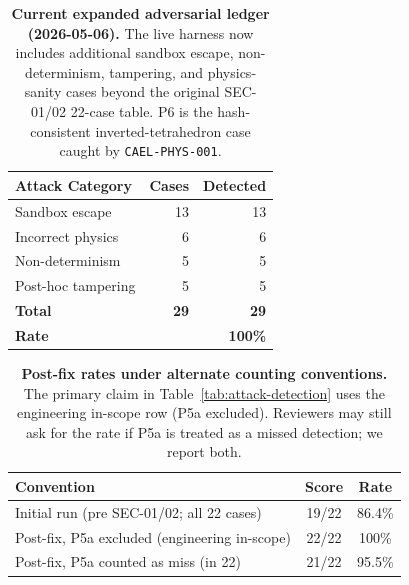 \documentclass[letterpaper,twocolumn,10pt]{article}
\providecommand{\measuredFrom}[1]{}
\begin{document}
\begin{table}[t]
\centering
\caption{\textbf{Current expanded adversarial ledger (2026-05-06).}
  The live harness now includes additional sandbox escape, non-determinism,
  tampering, and physics-sanity cases beyond the original SEC-01/02
  22-case table. P6 is the hash-consistent inverted-tetrahedron case
  caught by \texttt{CAEL-PHYS-001}.}
\label{tab:attack-detection-expanded}
\small
\measuredFrom{HoloScript/packages/security-sandbox/src/__tests__/adversarial-holo.test.ts}%
\begin{tabular}{@{}lrr@{}}
\toprule
\textbf{Attack Category} & \textbf{Cases} & \textbf{Detected} \\
\midrule
Sandbox escape      & 13 & 13 \\
Incorrect physics   & 6  & 6  \\
Non-determinism     & 5  & 5  \\
Post-hoc tampering  & 5  & 5  \\
\midrule
\textbf{Total}      & \textbf{29} & \textbf{29} \\
\textbf{Rate}       &              & \textbf{100\%} \\
\bottomrule
\end{tabular}
\end{table}

\begin{table}[t]
\centering
\caption{\textbf{Post-fix rates under alternate counting conventions.}
  The primary claim in Table~\ref{tab:attack-detection} uses the
  engineering in-scope row (P5a excluded). Reviewers may still ask for
  the rate if P5a is treated as a missed detection; we report both.}
\label{tab:attack-detection-counting}
\small
\measuredFrom{HoloScript/packages/security-sandbox/src/__tests__/adversarial-holo.test.ts}%
\begin{tabular}{@{}lcc@{}}
\toprule
\textbf{Convention} & \textbf{Score} & \textbf{Rate} \\
\midrule
Initial run (pre SEC-01/02; all 22 cases) & 19/22 & 86.4\% \\
Post-fix, P5a excluded (engineering in-scope) & 22/22 & 100\% \\
Post-fix, P5a counted as miss (in 22)     & 21/22 & 95.5\% \\
\bottomrule
\end{tabular}
\end{table}
\end{document}
